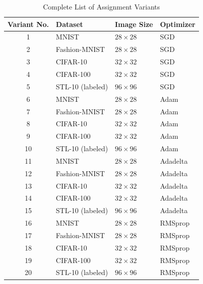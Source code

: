 \documentclass[12pt, a4paper]{article}
\begin{document}
\begin{table}[htpb]
    \centering
    \caption{Complete List of Assignment Variants}
    \label{tab:all_variants}
    \renewcommand{\arraystretch}{1.2} %
    \begin{tabular}{clll}
        \toprule
        \textbf{Variant No.} & \textbf{Dataset} & \textbf{Image Size} & \textbf{Optimizer} \\
        \midrule
        1 & MNIST & $28 \times 28$ & SGD \\
        2 & Fashion-MNIST & $28 \times 28$ & SGD \\
        3 & CIFAR-10 & $32 \times 32$ & SGD \\
        4 & CIFAR-100 & $32 \times 32$ & SGD \\
        5 & STL-10 (labeled) & $96 \times 96$ & SGD \\
        \midrule
        6 & MNIST & $28 \times 28$ & Adam \\
        7 & Fashion-MNIST & $28 \times 28$ & Adam \\
        8 & CIFAR-10 & $32 \times 32$ & Adam \\
        9 & CIFAR-100 & $32 \times 32$ & Adam \\
        10 & STL-10 (labeled) & $96 \times 96$ & Adam \\
        \midrule
        11 & MNIST & $28 \times 28$ & Adadelta \\
        12 & Fashion-MNIST & $28 \times 28$ & Adadelta \\
        13 & CIFAR-10 & $32 \times 32$ & Adadelta \\
        14 & CIFAR-100 & $32 \times 32$ & Adadelta \\
        15 & STL-10 (labeled) & $96 \times 96$ & Adadelta \\
        \midrule
        16 & MNIST & $28 \times 28$ & RMSprop \\
        17 & Fashion-MNIST & $28 \times 28$ & RMSprop \\
        18 & CIFAR-10 & $32 \times 32$ & RMSprop \\
        19 & CIFAR-100 & $32 \times 32$ & RMSprop \\
        20 & STL-10 (labeled) & $96 \times 96$ & RMSprop \\
        \bottomrule
    \end{tabular}
\end{table}
\end{document}
